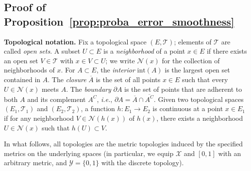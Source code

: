 \documentclass{article}
\theoremstyle{plain}
\theoremstyle{definition}
\theoremstyle{remark}
\begin{document}
\subsection{Proof of Proposition~\ref{prop:proba_error_smoothness}}
\label{anex:smooth}

\textbf{Topological notation.}
Fix a topological space $(E,\mathcal T)$; elements of $\mathcal T$ are called \emph{open sets}. A subset $U\subset E$ is a \emph{neighborhood} of a point $x\in E$ if there exists an open set $V\in\mathcal T$ with $x\in V\subset U$; we write $\mathcal N(x)$ for the collection of neighborhoods of $x$. For $A\subset E$, the \emph{interior} $\mathrm{int}(A)$ is the largest open set contained in $A$. The \emph{closure} $\overline{A}$ is the set of all points $x\in E$ such that every $U\in\mathcal N(x)$ meets $A$. The \emph{boundary} $\partial A$ is the set of points that are adherent to both $A$ and its complement $A^C$, \textit{i.e.}, $\partial A = \overline{A} \cap \overline{A^C}$. Given two topological spaces $(E_1, \mathcal{T}_1)$ and $(E_2, \mathcal{T}_2)$, a function $h:E_1 \rightarrow E_2$ is continuous at a point $x \in E_1$ if for any neighborhood $V \in \mathcal{N}(h(x))$ of $h(x)$, there exists a neighborhood $U \in \mathcal{N}(x)$ such that $ h(U) \subset V$.


In what follows, all topologies are the metric topologies induced by the specified metrics on the underlying spaces (in particular, we equip $\mathcal X$  and $[0,1]$ with an arbitrary metric, and $\mathcal Y=\{0,1\}$ with the discrete topology). 
\end{document}
